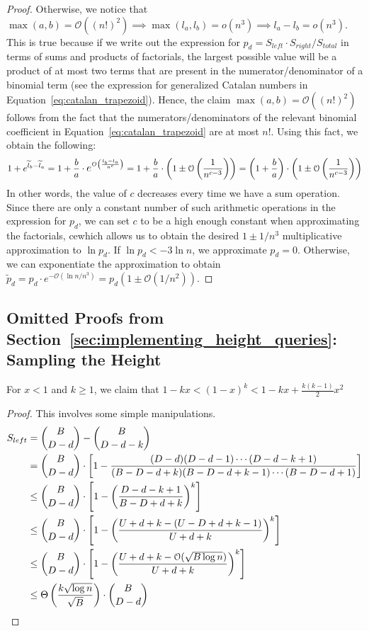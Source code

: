 \begin{proof}
Otherwise, we notice that $\max(a,b) = \mathcal O\left((n!)^2\right)\implies \max(l_a, l_b) = o(n^3)\implies l_a-l_b = o(n^3)$.
This is true because if we write out the expression for $p_d = S_{left}\cdot S_{right}/S_{total}$ in terms of sums and products of factorials,
the largest possible value will be a product of at most two terms that are present in the numerator/denominator of a binomial term
(see the expression for generalized Catalan numbers in Equation~\ref{eq:catalan_trapezoid}).
Hence, the claim $\max(a,b) = \mathcal O\left((n!)^2\right)$ follows from the fact that
the numerators/denominators of the relevant binomial coefficient in Equation~\ref{eq:catalan_trapezoid} are at most $n!$.
Using this fact, we obtain the following:
\[
1+e^{\widetilde l_b-\widetilde l_a} = 1+\frac ba\cdot \mathlarger e^{\mathcal O\left( \frac{l_b-l_a}{n^c}\right)}
= 1+\frac ba\cdot\left( 1 \pm \mathcal O\left( \frac{1}{n^{c-3}} \right)\right)
= \left( 1+\frac ba\right)\cdot\left( 1 \pm \mathcal O\left( \frac{1}{n^{c-3}} \right)\right)
\]
In other words, the value of $c$ decreases every time we have a sum operation.
Since there are only a constant number of such arithmetic operations in the expression for $p_d$,
we can set $c$ to be a high enough constant when approximating the factorials,
cewhich allows us to obtain the desired $1\pm1/n^3$ multiplicative approximation to $\ln p_d$.
If $\ln p_d < -3\ln n$, we approximate $p_d = 0$.
Otherwise, we can exponentiate the approximation to obtain $\widetilde p_d=p_d\cdot e^{-\mathcal O(\ln n/n^3)} = p_d\left( 1\pm\mathcal O(1/n^2)\right)$.
\end{proof}



\subsection{Omitted Proofs from Section~\ref{sec:implementing_height_queries}: Sampling the Height}%
\label{sec:appendix_implementing_height_queries}
\begin{lemma}
\label{lem:taylor_bound}
For $x < 1$ and $k\ge 1$, we claim that $1-kx < (1-x)^k < 1 - kx + \frac{k(k-1)}{2}x^2$
\end{lemma}


\DLeftBound*
\begin{proof}
This involves some simple manipulations.
\begin{align}
S_{left} &= {{B}\choose{D-d}}-{{B}\choose{D-d-k}}\\
&= {{B}\choose{D-d}}\cdot \left[1-\frac{(D-d)(D-d-1)\cdots(D-d-k+1)}{(B-D-d+k)(B-D-d+k-1)\cdots(B-D-d+1)}\right]\\
&\le {{B}\choose{D-d}}\cdot \left[1-\left(\frac{D-d-k+1}{B-D+d+k}\right)^k\right]\\
&\le {{B}\choose{D-d}}\cdot \left[1-\left(\frac{U+d+k-(U-D+d+k-1)}{U+d+k}\right)^k\right]\\
&\le {{B}\choose{D-d}}\cdot \left[1-\left(\frac{U+d+k-\Bo(\sqrt{B\log n})}{U+d+k}\right)^k\right]\\
&\le \Theta \left( \frac{k\sqrt{\log n}}{\sqrt{B}} \right) \cdot{{B}\choose{D-d}}
\end{align}
\end{proof}

